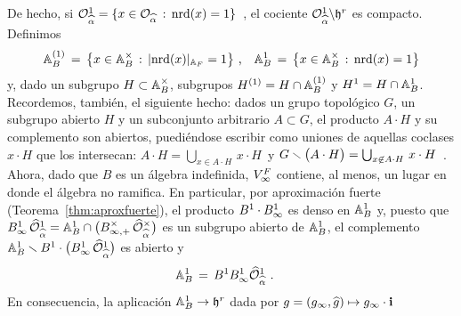 \begin{obsVariedadDeShimuraEsCompacta}\label{obs:variedaddeshimuraescompacta}
	De hecho, si
	\begin{math}
		\cal{O}_{\hhat{\alpha}}^{1}=
			\{x\in\cal{O}_{\hhat{\alpha}}\,:\,\nrd(x)=1\}
	\end{math}~,
	el cociente
	$\cal{O}_{\hhat{\alpha}}^{1}\backslash\hP^{r}$ es compacto.
	Definimos
	\begin{align*}
		\adeles{B}^{(1)} \,=\,\big\{x\in\ideles{B}\,:\,
			|\nrd(x)|_{\adeles{F}}=1\big\}\text{ ,}\quad
		\adeles{B}^{1} \,=\,\big\{x\in\ideles{B}\,:\,\nrd(x)=1\big\}
	\end{align*}
	y, dado un subgrupo $H\subset\ideles{B}$, subgrupos
	$H^{(1)}=H\cap\adeles{B}^{(1)}$ y $H^{1}=H\cap\adeles{B}^{1}$.
	Recordemos, tambi\'{e}n, el siguiente hecho: dados un grupo
	topol\'{o}gico $G$, un subgrupo abierto $H$ y un subconjunto arbitrario
	$A\subset G$, el producto $A\cdot H$ y su complemento son abiertos,
	puedi\'{e}ndose escribir como uniones de aquellas coclases $x\cdot H$
	que los intersecan:
	\begin{math}
		A\cdot H=\bigcup_{x\in A\cdot H}\,x\cdot H
	\end{math}~y
	\begin{math}
		G\setmin\big(A\cdot H\big)=
			\bigcup_{x\not\in A\cdot H}\,x\cdot H
	\end{math}~. Ahora, dado que $B$ es un \'{a}lgebra indefinida,
	$\lugares[\infty]{F}$ contiene, al menos, un lugar en donde el
	\'{a}lgebra no ramifica. En particular, por aproximaci\'{o}n fuerte
	(Teorema~\ref{thm:aproxfuerte}), el producto $B^{1}\cdot\Adinf{B}^{1}$
	es denso en $\adeles{B}^{1}$ y, puesto que
	\begin{math}
		\Adinf{B}^{1}\,\Adfin{\cal{O}}^{1}_{\hhat{\alpha}}=
			\adeles{B}^{1}\cap\big(B^{\times}_{\infty,+}\,
				\Idfin{\cal{O}}_{\hhat{\alpha}}\big)
	\end{math}
	es un subgrupo abierto de $\adeles{B}^{1}$, el complemento
	\begin{math}
		\adeles{B}^{1}\setmin B^{1}\cdot\big(\Adinf{B}^{1}\,
			\Adfin{\cal{O}}^{1}_{\hhat{\alpha}}\big)
	\end{math}
	es abierto y
	\begin{align*}
		\adeles{B}^{1} & \,=\, B^{1}\Adinf{B}^{1}
			\Adfin{\cal{O}}^{1}_{\hhat{\alpha}}
		\text{ .}
	\end{align*}
	En consecuencia, la aplicaci\'{o}n $\adeles{B}^{1}\rightarrow\hP^{r}$
	dada por $g=(g_{\infty},\hhat{g})\mapsto g_{\infty}\cdot\mathbf{i}$

\end{obsVariedadDeShimuraEsCompacta}
